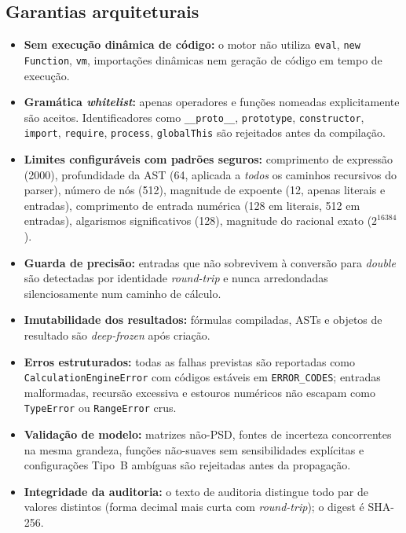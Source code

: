 \documentclass[11pt,a4paper]{article}
\begin{document}
\subsection{Garantias arquiteturais}

\begin{itemize}
  \item \textbf{Sem execução dinâmica de código:} o motor não utiliza \texttt{eval}, \texttt{new Function}, \texttt{vm}, importações dinâmicas nem geração de código em tempo de execução.
  \item \textbf{Gramática \emph{whitelist}:} apenas operadores e funções nomeadas explicitamente são aceitos. Identificadores como \texttt{\_\_proto\_\_}, \texttt{prototype}, \texttt{constructor}, \texttt{import}, \texttt{require}, \texttt{process}, \texttt{globalThis} são rejeitados antes da compilação.
  \item \textbf{Limites configuráveis com padrões seguros:} comprimento de expressão (2000), profundidade da AST (64, aplicada a \emph{todos} os caminhos recursivos do parser), número de nós (512), magnitude de expoente (12, apenas literais e entradas), comprimento de entrada numérica (128 em literais, 512 em entradas), algarismos significativos (128), magnitude do racional exato (\(2^{16384}\)).
  \item \textbf{Guarda de precisão:} entradas que não sobrevivem à conversão para \emph{double} são detectadas por identidade \emph{round-trip} e nunca arredondadas silenciosamente num caminho de cálculo.
  \item \textbf{Imutabilidade dos resultados:} fórmulas compiladas, ASTs e objetos de resultado são \emph{deep-frozen} após criação.
  \item \textbf{Erros estruturados:} todas as falhas previstas são reportadas como \texttt{CalculationEngineError} com códigos estáveis em \texttt{ERROR\_CODES}; entradas malformadas, recursão excessiva e estouros numéricos não escapam como \texttt{TypeError} ou \texttt{RangeError} crus.
  \item \textbf{Validação de modelo:} matrizes não-PSD, fontes de incerteza concorrentes na mesma grandeza, funções não-suaves sem sensibilidades explícitas e configurações Tipo~B ambíguas são rejeitadas antes da propagação.
  \item \textbf{Integridade da auditoria:} o texto de auditoria distingue todo par de valores distintos (forma decimal mais curta com \emph{round-trip}); o digest é SHA-256.
\end{itemize}
\end{document}
